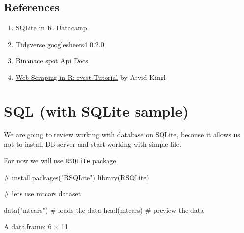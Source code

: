 \documentclass[
  letterpaper,
  DIV=11,
  numbers=noendperiod]{scrreprt}
\newenvironment{Shaded}{\begin{snugshade}}{\end{snugshade}}
\newcommand{\CommentTok}[1]{\textcolor[rgb]{0.37,0.37,0.37}{#1}}
\newcommand{\FunctionTok}[1]{\textcolor[rgb]{0.28,0.35,0.67}{#1}}
\newcommand{\NormalTok}[1]{\textcolor[rgb]{0.00,0.23,0.31}{#1}}
\newcommand{\StringTok}[1]{\textcolor[rgb]{0.13,0.47,0.30}{#1}}
\providecommand{\tightlist}{%
  \setlength{\itemsep}{0pt}\setlength{\parskip}{0pt}}\usepackage{longtable,booktabs,array}
\begin{document}
\section{References}\label{references-4}

\begin{enumerate}
\def\labelenumi{\arabic{enumi}.}
\tightlist
\item
  \href{https://www.datacamp.com/community/tutorials/sqlite-in-r}{SQLite
  in R. Datacamp}
\item
  \href{https://www.tidyverse.org/blog/2020/05/googlesheets4-0-2-0/}{Tidyverse
  googlesheets4 0.2.0}
\item
  \href{https://github.com/binance/binance-spot-api-docs/blob/master/rest-api.md\#klinecandlestick-data}{Binanace
  spot Api Docs}
\item
  \href{https://www.datacamp.com/community/tutorials/r-web-scraping-rvest}{Web
  Scraping in R: rvest Tutorial} by Arvid Kingl
\end{enumerate}

\chapter{SQL (with SQLite sample)}\label{sql-with-sqlite-sample}

We are going to review working with database on SQLite, becouse it
allows us not to install DB-server and start working with simple file.

For now we will use \texttt{RSQLite} package.

\begin{Shaded}
\begin{Highlighting}[]
\CommentTok{\# install.packages("RSQLite")}
\FunctionTok{library}\NormalTok{(RSQLite)}
\end{Highlighting}
\end{Shaded}

\begin{Shaded}
\begin{Highlighting}[]
\CommentTok{\# let\textquotesingle{}s use mtcars dataset}

\FunctionTok{data}\NormalTok{(}\StringTok{"mtcars"}\NormalTok{) }\CommentTok{\# loads the data}
\FunctionTok{head}\NormalTok{(mtcars) }\CommentTok{\# preview the data}
\end{Highlighting}
\end{Shaded}

A data.frame: 6 × 11
\end{document}
